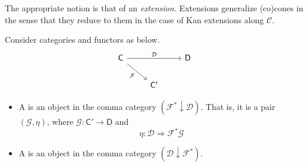 \documentclass[notes.tex]{subfiles}
\begin{document}
The appropriate notion is that of an \emph{extension.} Extensions generalize (co)cones in the sense that they reduce to them in the case of Kan extensions along $\mathcal{C}$.

\begin{definition}[extension]
  \label{def:extension}
  Consider categories and functors as below.
  \begin{equation*}
    \begin{tikzcd}
      \mathsf{C}
      \arrow[dr, swap, "\mathcal{F}"]
      \arrow[rr, "\mathcal{D}"]
      && \mathsf{D}
      \\
      & \mathsf{C'}
    \end{tikzcd}
  \end{equation*}
  \begin{itemize}
    \item A  is an object in the comma category $(\mathcal{F}^{*} \downarrow \mathcal{D})$. That is, it is a pair $(\mathcal{G}, \eta)$, where $\mathcal{G}\colon \mathsf{C}' \to \mathsf{D}$ and
      \begin{equation*}
        \eta\colon \mathcal{D} \Rightarrow \mathcal{F}^{*}\mathcal{G}
      \end{equation*}

    \item A  is an object in the comma category $(\mathcal{D} \downarrow \mathcal{F}^{*})$.
  \end{itemize}
\end{definition}
\end{document}
